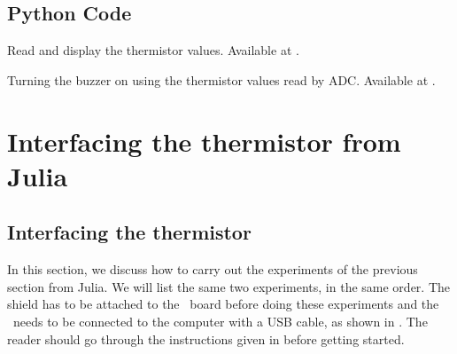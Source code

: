 \subsection{Python Code}
\label{sec:therm-pyhton-code}

\begin{pycode}
   {Read and display
    the thermistor values.  Available at
    .}
  \label{py:therm-read}
  
\end{pycode}

\begin{pycode}
  {Turning the buzzer on using the thermistor values read by
    ADC.  Available at .}
  \label{py:therm-buzzer}
  
\end{pycode}

\section{Interfacing the thermistor from Julia}
\subsection{Interfacing the thermistor}
In this section, we discuss how to carry out the experiments of the
previous section from Julia.  We will list the same two experiments,
in the same order.  The shield has to be attached to the \arduino\ board
before doing these experiments and the \arduino\ needs to be connected to the computer
with a USB cable, as shown in .
The reader should go through the instructions given in  before getting started.


